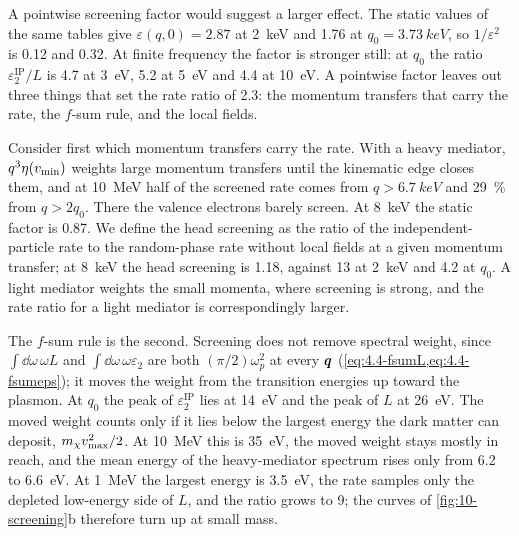 A pointwise screening factor would suggest a larger effect. The static values of the same tables give $\varepsilon(q,0) = 2.87$ at \SI{2}{keV} and 1.76 at $q_0 = \SI{3.73}{keV}$, so $1/\varepsilon^2$ is 0.12 and 0.32. At finite frequency the factor is stronger still: at $q_0$ the ratio $\varepsilon_2^{\mathrm{IP}}/L$ is 4.7 at \SI{3}{eV}, 5.2 at \SI{5}{eV} and 4.4 at \SI{10}{eV}. A pointwise factor leaves out three things that set the rate ratio of 2.3: the momentum transfers that carry the rate, the $f$-sum rule, and the local fields.

Consider first which momentum transfers carry the rate. With a heavy mediator, $q^3\eta(v_{\mathrm{min}})$ weights large momentum transfers until the kinematic edge closes them, and at \SI{10}{MeV} half of the screened rate comes from $q > \SI{6.7}{keV}$ and \SI{29}{\percent} from $q > 2q_0$. There the valence electrons barely screen. At \SI{8}{keV} the static factor is 0.87. We define the head screening as the ratio of the independent-particle rate to the random-phase rate without local fields at a given momentum transfer; at \SI{8}{keV} the head screening is 1.18, against 13 at \SI{2}{keV} and 4.2 at $q_0$. A light mediator weights the small momenta, where screening is strong, and the rate ratio for a light mediator is correspondingly larger.

The $f$-sum rule is the second. Screening does not remove spectral weight, since $\int\dd\omega\,\omega L$ and $\int\dd\omega\,\omega\varepsilon_2$ are both $(\pi/2)\omega_p^2$ at every $\bm{q}$ (\cref{eq:4.4-fsumL,eq:4.4-fsumeps}); it moves the weight from the transition energies up toward the plasmon. At $q_0$ the peak of $\varepsilon_2^{\mathrm{IP}}$ lies at \SI{14}{eV} and the peak of $L$ at \SI{26}{eV}. The moved weight counts only if it lies below the largest energy the dark matter can deposit, $m_{\chi} v_{\mathrm{max}}^2/2$. At \SI{10}{MeV} this is \SI{35}{eV}, the moved weight stays mostly in reach, and the mean energy of the heavy-mediator spectrum rises only from 6.2 to \SI{6.6}{eV}. At \SI{1}{MeV} the largest energy is \SI{3.5}{eV}, the rate samples only the depleted low-energy side of $L$, and the ratio grows to 9; the curves of \cref{fig:10-screening}b therefore turn up at small mass.

